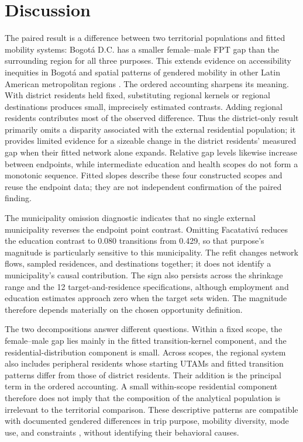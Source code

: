 \documentclass[11pt]{article}
\begin{document}
\section{Discussion}
The paired result is a difference between two territorial populations and fitted mobility systems: Bogotá D.C. has a smaller female--male FPT gap than the surrounding region for all three purposes. This extends evidence on accessibility inequities in Bogotá \citep{guzman2017} and spatial patterns of gendered mobility in other Latin American metropolitan regions \citep{gauvin2020,macedo2022}. The ordered accounting sharpens its meaning. With district residents held fixed, substituting regional kernels or regional destinations produces small, imprecisely estimated contrasts. Adding regional residents contributes most of the observed difference. Thus the district-only result primarily omits a disparity associated with the external residential population; it provides limited evidence for a sizeable change in the district residents' measured gap when their fitted network alone expands. Relative gap levels likewise increase between endpoints, while intermediate education and health scopes do not form a monotonic sequence. Fitted slopes describe these four constructed scopes and reuse the endpoint data; they are not independent confirmation of the paired finding.

The municipality omission diagnostic indicates that no single external municipality reverses the endpoint point contrast. Omitting Facatativá reduces the education contrast to 0.080 transitions from 0.429, so that purpose's magnitude is particularly sensitive to this municipality. The refit changes network flows, sampled residences, and destinations together; it does not identify a municipality's causal contribution. The sign also persists across the shrinkage range and the 12 target-and-residence specifications, although employment and education estimates approach zero when the target sets widen. The magnitude therefore depends materially on the chosen opportunity definition.

The two decompositions answer different questions. Within a fixed scope, the female--male gap lies mainly in the fitted transition-kernel component, and the residential-distribution component is small. Across scopes, the regional system also includes peripheral residents whose starting UTAMs and fitted transition patterns differ from those of district residents. Their addition is the principal term in the ordered accounting. A small within-scope residential component therefore does not imply that the composition of the analytical population is irrelevant to the territorial comparison. These descriptive patterns are compatible with documented gendered differences in trip purpose, mobility diversity, mode use, and constraints \citep{macedo2020,macedo2022,battiston2023}, without identifying their behavioral causes.
\end{document}
